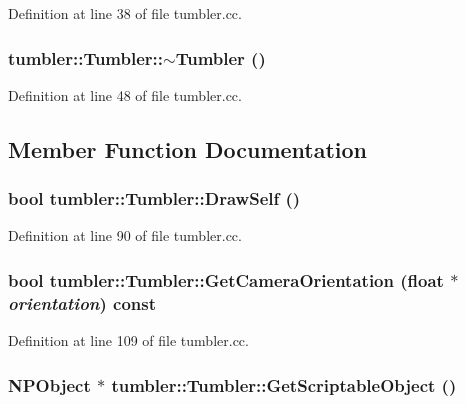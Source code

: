 Definition at line 38 of file tumbler.cc.

\hypertarget{classtumbler_1_1_tumbler_a80349e180aa825c15d63bada00c6e9a8}{
\subsubsection[{$\sim$Tumbler}]{\setlength{\rightskip}{0pt plus 5cm}tumbler::Tumbler::$\sim$Tumbler ()}}
\label{classtumbler_1_1_tumbler_a80349e180aa825c15d63bada00c6e9a8}


Definition at line 48 of file tumbler.cc.



\subsection{Member Function Documentation}
\hypertarget{classtumbler_1_1_tumbler_a8da0b0b0e85708487c55f6ca5c999da1}{
\subsubsection[{DrawSelf}]{\setlength{\rightskip}{0pt plus 5cm}bool tumbler::Tumbler::DrawSelf ()}}
\label{classtumbler_1_1_tumbler_a8da0b0b0e85708487c55f6ca5c999da1}


Definition at line 90 of file tumbler.cc.

\hypertarget{classtumbler_1_1_tumbler_a5e01d6cde9baab4e5c2aa4b834733bf2}{
\subsubsection[{GetCameraOrientation}]{\setlength{\rightskip}{0pt plus 5cm}bool tumbler::Tumbler::GetCameraOrientation (float $\ast$ {\em orientation}) const}}
\label{classtumbler_1_1_tumbler_a5e01d6cde9baab4e5c2aa4b834733bf2}


Definition at line 109 of file tumbler.cc.

\hypertarget{classtumbler_1_1_tumbler_ad438453c62d1edcbdd5cb39a38143a0b}{
\subsubsection[{GetScriptableObject}]{\setlength{\rightskip}{0pt plus 5cm}NPObject $\ast$ tumbler::Tumbler::GetScriptableObject ()}}
\label{classtumbler_1_1_tumbler_ad438453c62d1edcbdd5cb39a38143a0b}


